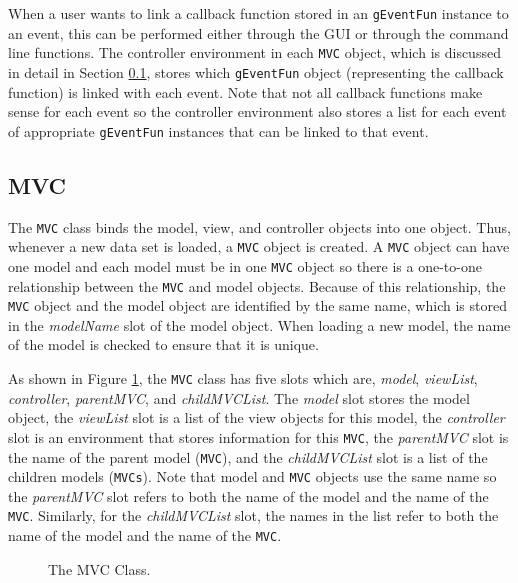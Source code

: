 \documentclass{article}[11pt]
\newcommand{\Robject}[1]{{\texttt{#1}}}
\newcommand{\Rslot}[1]{\textsl{#1}}
\newcommand{\Rclass}[1]{\texttt{#1}}
\begin{document}
When a user wants to link a callback function stored in an \Robject{gEventFun}
instance to an event, this can be performed either through the GUI or through
the command line functions.  The controller environment in each \Robject{MVC}
object, which is discussed in detail in Section \ref{Ssec:OneMVC},
stores which \Robject{gEventFun} object (representing the callback
function) is linked with each event.  Note that not all callback functions
make sense for each event so the controller environment also stores a list
for each event of appropriate \Robject{gEventFun} instances that can be linked
to that event.

\subsection{MVC}\label{Ssec:OneMVC}
 
The \Rclass{MVC} class binds the model, view, and
controller objects into one object.  Thus, whenever a new data set
is loaded, a \Robject{MVC} object is created.  A \Robject{MVC} object can have
one model and each model must be in one \Robject{MVC}
object so there is a one-to-one relationship between the \Robject{MVC} and
model objects.  Because of this relationship, the \Robject{MVC}
object and the model object are identified by the same name, which
is stored in the \Rslot{modelName} slot of the model object.  When
loading a new model, the name of the model is checked to
ensure that it is unique.

As shown in Figure \ref{Fig:MVCClass}, the \Rclass{MVC} class has five slots
which are, \Rslot{model}, \Rslot{viewList}, \Rslot{controller},
\Rslot{parentMVC}, and \Rslot{childMVCList}.  The \Rslot{model} slot stores
the model object, the \Rslot{viewList} slot is a list of the
view objects for this model, the \Rslot{controller} slot is an
environment that stores information for this \Robject{MVC}, the
\Rslot{parentMVC} slot is the name of the parent model
(\Robject{MVC}), and the \Rslot{childMVCList} slot is a list of the children
models (\Robject{MVCs}).  Note that model and
\Robject{MVC} objects use the same name so the \Rslot{parentMVC} slot refers
to both the name of the model and the name of the \Robject{MVC}.
Similarly, for the \Rslot{childMVCList} slot, the names in the list refer to
both the name of the model and the name of the \Robject{MVC}. 

\begin{figure}[ht]
  \begin{center}
    \caption{ The MVC Class. }
    \label{Fig:MVCClass}
  \end{center}
\end{figure}
\end{document}
